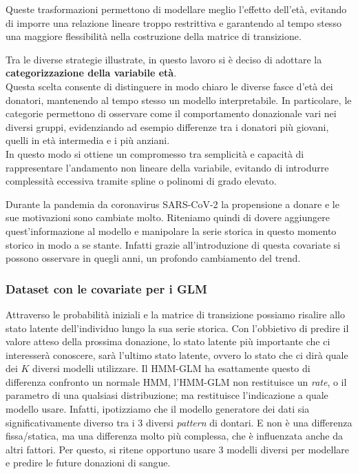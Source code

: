 \documentclass[
  italian,
  a4paper,
  a4paper,
  twoside,
  open=right,
  12pt]{scrbook}
\theoremstyle{definition}
\theoremstyle{remark}
\begin{document}
Queste trasformazioni permettono di modellare meglio l'effetto dell'età,
evitando di imporre una relazione lineare troppo restrittiva e
garantendo al tempo stesso una maggiore flessibilità nella costruzione
della matrice di transizione.

Tra le diverse strategie illustrate, in questo lavoro si è deciso di
adottare la \textbf{categorizzazione della variabile età}.\\
Questa scelta consente di distinguere in modo chiaro le diverse fasce
d'età dei donatori, mantenendo al tempo stesso un modello
interpretabile. In particolare, le categorie permettono di osservare
come il comportamento donazionale vari nei diversi gruppi, evidenziando
ad esempio differenze tra i donatori più giovani, quelli in età
intermedia e i più anziani.\\
In questo modo si ottiene un compromesso tra semplicità e capacità di
rappresentare l'andamento non lineare della variabile, evitando di
introdurre complessità eccessiva tramite spline o polinomi di grado
elevato.

Durante la pandemia da coronavirus SARS-CoV-2 la propensione a donare e
le sue motivazioni sono cambiate molto. Riteniamo quindi di dovere
aggiungere quest'informazione al modello e manipolare la serie storica
in questo momento storico in modo a se stante. Infatti grazie
all'introduzione di questa covariate si possono osservare in quegli
anni, un profondo cambiamento del trend.

\subsubsection{Dataset con le covariate per i GLM}\label{sec-emissioni}

Attraverso le probabilità iniziali e la matrice di transizione possiamo
risalire allo stato latente dell'individuo lungo la sua serie storica.
Con l'obbietivo di predire il valore atteso della prossima donazione, lo
stato latente più importante che ci interesserà conoscere, sarà l'ultimo
stato latente, ovvero lo stato che ci dirà quale dei \(K\) diversi
modelli utilizzare. Il HMM-GLM ha esattamente questo di differenza
confronto un normale HMM, l'HMM-GLM non restituisce un \emph{rate}, o il
parametro di una qualsiasi distribuzione; ma restituisce l'indicazione a
quale modello usare. Infatti, ipotizziamo che il modello generatore dei
dati sia significativamente diverso tra i 3 diversi \emph{pattern} di
dontari. E non è una differenza fissa/statica, ma una differenza molto
più complessa, che è influenzata anche da altri fattori. Per questo, si
ritene opportuno usare 3 modelli diversi per modellare e predire le
future donazioni di sangue.
\end{document}
